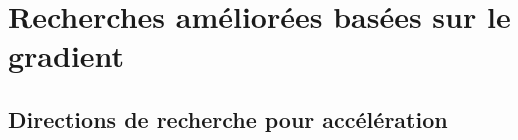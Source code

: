 \documentclass[12pt]{beamer}
\begin{document}
\section{Recherches améliorées basées sur le gradient}
\subsection{Directions de recherche pour accélération}
\end{document}
